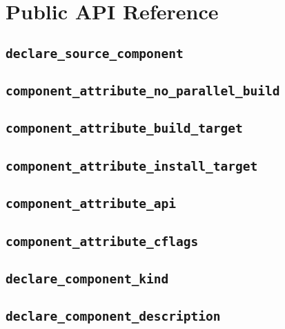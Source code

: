 %
%
%
%
\chapter{Public API Reference}
\section{\texttt{declare\_source\_component}}

\section{\texttt{component\_attribute\_no\_parallel\_build}}\label{api:no-parallel}
\section{\texttt{component\_attribute\_build\_target}}\label{api:build-target}
\section{\texttt{component\_attribute\_install\_target}}\label{api:install-target}
\section{\texttt{component\_attribute\_api}}\label{api:api}
\section{\texttt{component\_attribute\_cflags}}\label{api:cflags}
\section{\texttt{declare\_component\_kind}}\label{api:kind}
\section{\texttt{declare\_component\_description}}\label{api:description}
